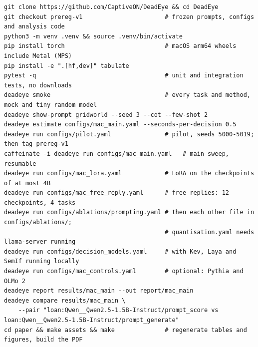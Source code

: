\begin{footnotesize}
\begin{verbatim}
git clone https://github.com/CaptiveON/DeadEye && cd DeadEye
git checkout prereg-v1                       # frozen prompts, configs and analysis code
python3 -m venv .venv && source .venv/bin/activate
pip install torch                            # macOS arm64 wheels include Metal (MPS)
pip install -e ".[hf,dev]" tabulate
pytest -q                                    # unit and integration tests, no downloads
deadeye smoke                                # every task and method, mock and tiny random model
deadeye show-prompt gridworld --seed 3 --cot --few-shot 2
deadeye estimate configs/mac_main.yaml --seconds-per-decision 0.5
deadeye run configs/pilot.yaml               # pilot, seeds 5000-5019; then tag prereg-v1
caffeinate -i deadeye run configs/mac_main.yaml   # main sweep, resumable
deadeye run configs/mac_lora.yaml            # LoRA on the checkpoints of at most 4B
deadeye run configs/mac_free_reply.yaml      # free replies: 12 checkpoints, 4 tasks
deadeye run configs/ablations/prompting.yaml # then each other file in configs/ablations/;
                                             # quantisation.yaml needs llama-server running
deadeye run configs/decision_models.yaml     # with Kev, Laya and SemIf running locally
deadeye run configs/mac_controls.yaml        # optional: Pythia and OLMo 2
deadeye report results/mac_main --out report/mac_main
deadeye compare results/mac_main \
    --pair "loan:Qwen__Qwen2.5-1.5B-Instruct/prompt_score vs loan:Qwen__Qwen2.5-1.5B-Instruct/prompt_generate"
cd paper && make assets && make              # regenerate tables and figures, build the PDF
\end{verbatim}
\end{footnotesize}


